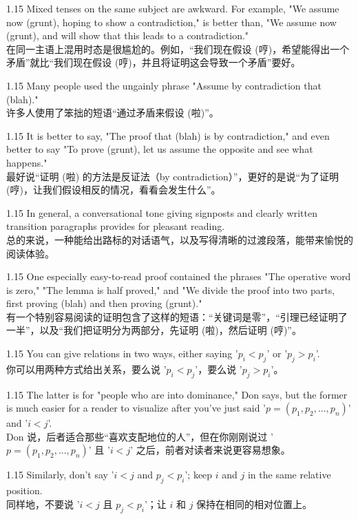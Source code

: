 \documentclass[12pt,a4paper]{article}
\newcommand{\bilingual}[2]{
    \begin{spacing}{1.15} %
        \noindent \normalsize #1 \\[-0.5ex] %
        \small \textcolor{blue!70!black}{#2} %
    \end{spacing}
    \vspace{0.8em} %
}
\begin{document}
\bilingual{Mixed tenses on the same subject are awkward. For example, "We assume now (grunt), hoping to show a contradiction," is better than, "We assume now (grunt), and will show that this leads to a contradiction."}
{在同一主语上混用时态是很尴尬的。例如，“我们现在假设 (哼)，希望能得出一个矛盾”就比“我们现在假设 (哼)，并且将证明这会导致一个矛盾”要好。} %

\bilingual{Many people used the ungainly phrase "Assume by contradiction that (blah)."}
{许多人使用了笨拙的短语“通过矛盾来假设 (啦)”。} %

\bilingual{It is better to say, "The proof that (blah) is by contradiction," and even better to say "To prove (grunt), let us assume the opposite and see what happens."}
{最好说“证明 (啦) 的方法是反证法（by contradiction）”，更好的是说“为了证明 (哼)，让我们假设相反的情况，看看会发生什么”。} %

\bilingual{In general, a conversational tone giving signposts and clearly written transition paragraphs provides for pleasant reading.}
{总的来说，一种能给出路标的对话语气，以及写得清晰的过渡段落，能带来愉悦的阅读体验。} %

\bilingual{One especially easy-to-read proof contained the phrases "The operative word is zero," "The lemma is half proved," and "We divide the proof into two parts, first proving (blah) and then proving (grunt)."}
{有一个特别容易阅读的证明包含了这样的短语：“关键词是零”，“引理已经证明了一半”，以及“我们把证明分为两部分，先证明 (啦)，然后证明 (哼)”。} %

\bilingual{You can give relations in two ways, either saying '$p_{i}<p_{j}$' or '$p_{j}>p_{i}$'.}
{你可以用两种方式给出关系，要么说 '$p_{i}<p_{j}$'，要么说 '$p_{j}>p_{i}$'。} %

\bilingual{The latter is for "people who are into dominance," Don says, but the former is much easier for a reader to visualize after you've just said '$p=(p_{1},p_{2},...,p_{n})$' and '$i<j$'.}
{Don 说，后者适合那些“喜欢支配地位的人”，但在你刚刚说过 '$p=(p_{1},p_{2},...,p_{n})$' 且 '$i<j$' 之后，前者对读者来说更容易想象。} %

\bilingual{Similarly, don't say '$i<j$ and $p_{j}<p_{i}$'; keep $i$ and $j$ in the same relative position.}
{同样地，不要说 '$i<j$ 且 $p_{j}<p_{i}$'；让 $i$ 和 $j$ 保持在相同的相对位置上。} %
\end{document}
